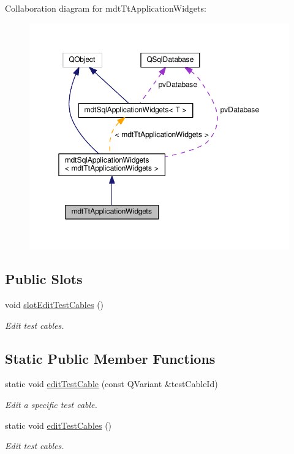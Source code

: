 Collaboration diagram for mdt\-Tt\-Application\-Widgets\-:\nopagebreak
\begin{figure}[H]
\begin{center}
\leavevmode
\includegraphics[width=350pt]{classmdt_tt_application_widgets__coll__graph}
\end{center}
\end{figure}
\subsection*{Public Slots}
\begin{DoxyCompactItemize}
\item 
void \hyperlink{classmdt_tt_application_widgets_ade43e8c686f77f2c8ffb5027a5afbe2d}{slot\-Edit\-Test\-Cables} ()
\begin{DoxyCompactList}\small\item\em Edit test cables. \end{DoxyCompactList}\end{DoxyCompactItemize}
\subsection*{Static Public Member Functions}
\begin{DoxyCompactItemize}
\item 
static void \hyperlink{classmdt_tt_application_widgets_ada31681ad53cfb7f93bfd9aa53ef30e6}{edit\-Test\-Cable} (const Q\-Variant \&test\-Cable\-Id)
\begin{DoxyCompactList}\small\item\em Edit a specific test cable. \end{DoxyCompactList}\item 
static void \hyperlink{classmdt_tt_application_widgets_ab8951db00142173b5124dcfd81804b56}{edit\-Test\-Cables} ()
\begin{DoxyCompactList}\small\item\em Edit test cables. \end{DoxyCompactList}\end{DoxyCompactItemize}
